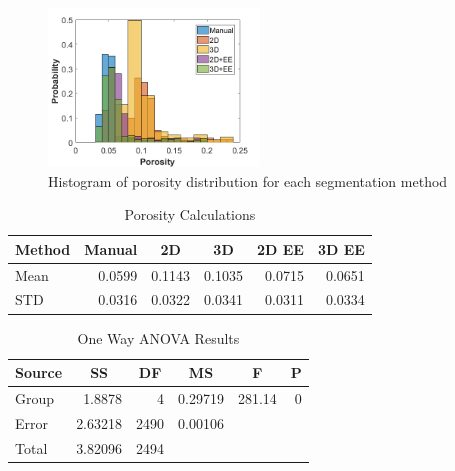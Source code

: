 \documentclass[11pt, twocolumn]{article}
\begin{document}
\begin{figure}[H]
	\centering
	\includegraphics[width=0.5\textwidth]{DataHistograms.png}
	\caption{Histogram of porosity distribution for each segmentation method}
	\label{fig:DataHist}
\end{figure}
\begin{table}[htbp]
	\centering
	\caption{Porosity Calculations}
	\begin{tabular}{|l|r|r|r|r|r|}
		\toprule
		Method & \multicolumn{1}{c|}{Manual} & \multicolumn{1}{c|}{2D} & \multicolumn{1}{c|}{3D} & \multicolumn{1}{c|}{2D EE} & \multicolumn{1}{c|}{3D EE} \\
		\midrule
		Mean  & 0.0599 & 0.1143 & 0.1035 & 0.0715 & 0.0651 \\
		\midrule
		STD   & 0.0316 & 0.0322 & 0.0341 & 0.0311 & 0.0334 \\
		\bottomrule
	\end{tabular}%
	\label{tab:DataTable}%
\end{table}%
\begin{table}[htbp]
	\centering
	\caption{One Way ANOVA Results}
	\begin{tabular}{|lrrrrr|}
		\toprule
		\multicolumn{1}{|c}{Source} & \multicolumn{1}{c}{SS} & \multicolumn{1}{c}{DF} & \multicolumn{1}{c}{MS} & \multicolumn{1}{c}{F} & \multicolumn{1}{c|}{P } \\
		\midrule
		Group & 1.8878 & 4     & 0.29719 & 281.14 & 0 \\
		Error & 2.63218 & 2490  & 0.00106 &       &  \\
		Total & 3.82096 & 2494  &       &       &  \\
		\bottomrule
	\end{tabular}%
	\label{tab:OneWay}%
\end{table}%
\end{document}
